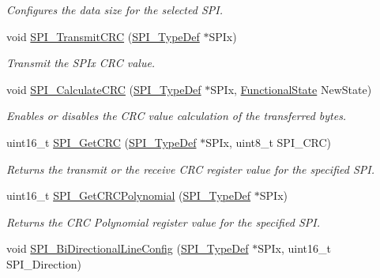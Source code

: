 \begin{DoxyCompactItemize}
\begin{DoxyCompactList}\small\item\em Configures the data size for the selected S\+PI. \end{DoxyCompactList}\item 
void \hyperlink{group___s_p_i___private___functions_gace8b1058e09bab150b0dbe5978810273}{S\+P\+I\+\_\+\+Transmit\+C\+RC} (\hyperlink{struct_s_p_i___type_def}{S\+P\+I\+\_\+\+Type\+Def} $\ast$S\+P\+Ix)
\begin{DoxyCompactList}\small\item\em Transmit the S\+P\+Ix C\+RC value. \end{DoxyCompactList}\item 
void \hyperlink{group___s_p_i___private___functions_ga64f7276d119e6cb58afc100f8832adb0}{S\+P\+I\+\_\+\+Calculate\+C\+RC} (\hyperlink{struct_s_p_i___type_def}{S\+P\+I\+\_\+\+Type\+Def} $\ast$S\+P\+Ix, \hyperlink{group___exported__types_gac9a7e9a35d2513ec15c3b537aaa4fba1}{Functional\+State} New\+State)
\begin{DoxyCompactList}\small\item\em Enables or disables the C\+RC value calculation of the transferred bytes. \end{DoxyCompactList}\item 
uint16\+\_\+t \hyperlink{group___s_p_i___private___functions_ga4c81c193516e82cf0a2fdc149ef20cc6}{S\+P\+I\+\_\+\+Get\+C\+RC} (\hyperlink{struct_s_p_i___type_def}{S\+P\+I\+\_\+\+Type\+Def} $\ast$S\+P\+Ix, uint8\+\_\+t S\+P\+I\+\_\+\+C\+RC)
\begin{DoxyCompactList}\small\item\em Returns the transmit or the receive C\+RC register value for the specified S\+PI. \end{DoxyCompactList}\item 
uint16\+\_\+t \hyperlink{group___s_p_i___private___functions_ga80fb9374cfce670f29128bb78568353f}{S\+P\+I\+\_\+\+Get\+C\+R\+C\+Polynomial} (\hyperlink{struct_s_p_i___type_def}{S\+P\+I\+\_\+\+Type\+Def} $\ast$S\+P\+Ix)
\begin{DoxyCompactList}\small\item\em Returns the C\+RC Polynomial register value for the specified S\+PI. \end{DoxyCompactList}\item 
void \hyperlink{group___s_p_i___private___functions_ga166171c421fc51da7714723524d41b45}{S\+P\+I\+\_\+\+Bi\+Directional\+Line\+Config} (\hyperlink{struct_s_p_i___type_def}{S\+P\+I\+\_\+\+Type\+Def} $\ast$S\+P\+Ix, uint16\+\_\+t S\+P\+I\+\_\+\+Direction)

\end{DoxyCompactItemize}
